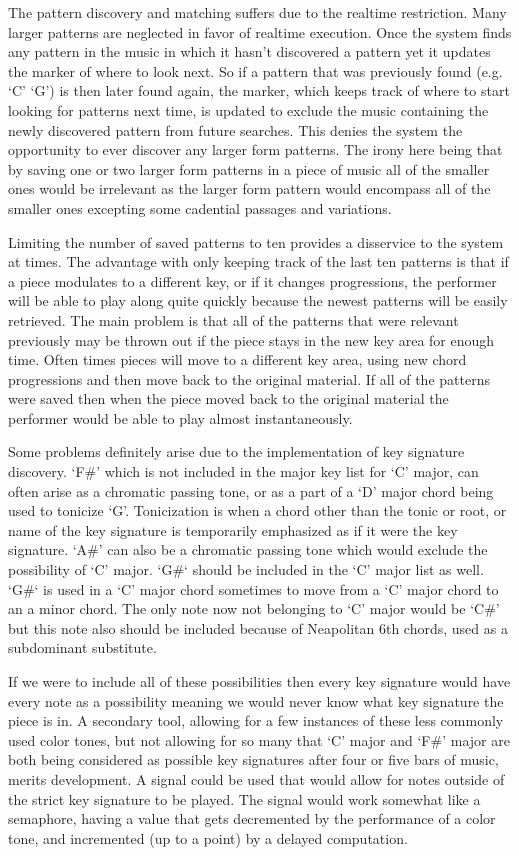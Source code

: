 \documentclass[12pt]{ucthesis}
\begin{document}
The pattern discovery and matching suffers due to the realtime restriction. Many larger patterns are neglected in favor of realtime execution. Once the system finds any pattern in the music in which it hasn't discovered a pattern yet it updates the marker of where to look next. So if a pattern that was previously found (e.g. `C' `G') is then later found again, the marker, which keeps track of where to start looking for patterns next time, is updated to exclude the music containing the newly discovered pattern from future searches. This denies the system the opportunity to ever discover any larger form patterns. The irony here being that by saving one or two larger form patterns in a piece of music all of the smaller ones would be irrelevant as the larger form pattern would encompass all of the smaller ones excepting some cadential passages and variations. 

Limiting the number of saved patterns to ten provides a disservice to the system at times. The advantage with only keeping track of the last ten patterns is that if a piece modulates to a different key, or if it changes progressions, the performer will be able to play along quite quickly because the newest patterns will be easily retrieved. The main problem is that all of the patterns that were relevant previously may be thrown out if the piece stays in the new key area for enough time. Often times pieces will move to a different key area, using new chord progressions and then move back to the original material. If all of the patterns were saved then when the piece moved back to the original material the performer would be able to play almost instantaneously. 

Some problems definitely arise due to the implementation of key signature discovery. `F\#' which is not included in the major key list for `C' major, can often arise as a chromatic passing tone, or as a part of a `D' major chord being used to tonicize `G'. Tonicization is when a chord other than the tonic or root, or name of the key signature is temporarily emphasized as if it were the key signature. `A\#' can also be a chromatic passing tone which would exclude the possibility of `C' major. `G\#` should be included in the `C' major list as well. `G\#` is used in a `C' major chord sometimes to move from a `C' major chord to an a minor chord. The only note now not belonging to `C' major would be `C\#' but this note also should be included because of Neapolitan 6th chords, used as a subdominant substitute.

If we were to include all of these possibilities then every key signature would have every note as a possibility meaning we would never know what key signature the piece is in. A secondary tool, allowing for a few instances of these less commonly used color tones, but not allowing for so many that `C' major and `F\#' major are both being considered as possible key signatures after four or five bars of music, merits development. A signal could be used that would allow for notes outside of the strict key signature to be played. The signal would work somewhat like a semaphore, having a value that gets decremented by the performance of a color tone, and incremented (up to a point) by a delayed computation. 
\end{document}
